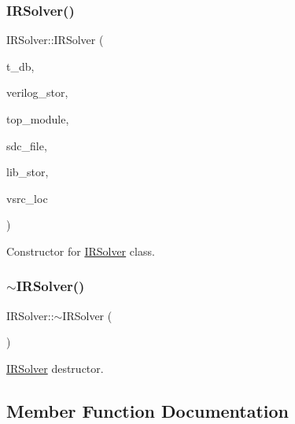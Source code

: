 \subsubsection{\texorpdfstring{I\+R\+Solver()}{IRSolver()}}
{\footnotesize\ttfamily I\+R\+Solver\+::\+I\+R\+Solver (\begin{DoxyParamCaption}\item[{odb\+::db\+Database $\ast$}]{t\+\_\+db,  }\item[{std\+::string}]{verilog\+\_\+stor,  }\item[{std\+::string}]{top\+\_\+module,  }\item[{std\+::string}]{sdc\+\_\+file,  }\item[{std\+::vector$<$ std\+::string $>$}]{lib\+\_\+stor,  }\item[{std\+::string}]{vsrc\+\_\+loc }\end{DoxyParamCaption})\hspace{0.3cm}{\ttfamily [inline]}}



Constructor for \hyperlink{classIRSolver}{I\+R\+Solver} class. 

\mbox{\label{classIRSolver_a3f8f596fc1314294c91650c9aea1b276}} 
\subsubsection{\texorpdfstring{$\sim$\+I\+R\+Solver()}{~IRSolver()}}
{\footnotesize\ttfamily I\+R\+Solver\+::$\sim$\+I\+R\+Solver (\begin{DoxyParamCaption}{ }\end{DoxyParamCaption})\hspace{0.3cm}{\ttfamily [inline]}}



\hyperlink{classIRSolver}{I\+R\+Solver} destructor. 



\subsection{Member Function Documentation}
\mbox{\label{classIRSolver_a72b07b8b929136c0cac95077dce87990}} 
